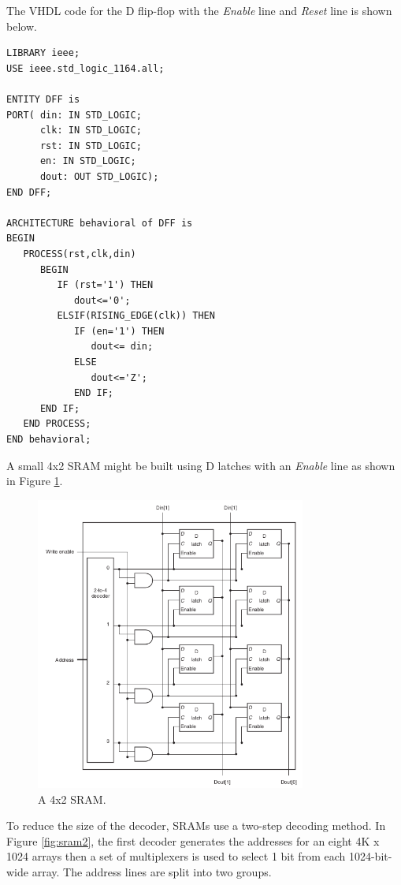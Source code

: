 \documentclass[a4paper, 11pt,oneside]{article}
\begin{document}
The VHDL code for the D flip-flop with the \textit{Enable} line and 
\textit{Reset} line is shown below. 

\begin{verbatim}
LIBRARY ieee;
USE ieee.std_logic_1164.all;

ENTITY DFF is
PORT( din: IN STD_LOGIC;
      clk: IN STD_LOGIC;
      rst: IN STD_LOGIC;
      en: IN STD_LOGIC;
      dout: OUT STD_LOGIC);
END DFF;

ARCHITECTURE behavioral of DFF is
BEGIN
   PROCESS(rst,clk,din)
      BEGIN
         IF (rst='1') THEN
            dout<='0';
         ELSIF(RISING_EDGE(clk)) THEN
            IF (en='1') THEN
               dout<= din;
            ELSE
               dout<='Z';
            END IF;
      END IF;
   END PROCESS;
END behavioral;
\end{verbatim}


A small 4x2 SRAM might be built using D latches with an \textit{Enable} line as 
shown in Figure \ref{fig:sram3}. 

\begin{figure}[H]
	\begin{center}
	\includegraphics[width=3.5in]{sram3.png}
	\caption{A 4x2 SRAM.}
	\label{fig:sram3} 
	\end{center}
\end{figure}

To reduce the size of the decoder, SRAMs use a two-step decoding method. In 
Figure \ref{fig:sram2}, the first decoder generates the addresses for an eight 
4K x 1024 arrays then a set of multiplexers is used to select 1 bit from each 
1024-bit-wide array. The address lines are split into two groups.
\end{document}
